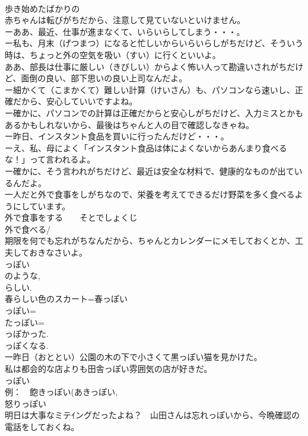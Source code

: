 \documentclass[8pt]{extreport}
\begin{document}
\begin{CJK}{UTF8}{min}
\\	歩き始めたばかりの
\\	赤ちゃんは転びがちだから、注意して見ていないといけません。
\\	ーああ、最近、仕事が進まなくて、いらいらしてしまう・・・。
\\	ー私も、月末（げつまつ）になると忙しいからいらいらしがちだけど、そういう時は、ちょっと外の空気を吸い（すい）に行くといいよ。
\\	ああ、部長は仕事に厳しい（きびしい）からよく怖い人って勘違いされがちだけど、面倒の良い、部下思いの良い上司なんだよ。　
\\	ー細かくて（こまかくて）難しい計算（けいさん）も、パソコンなら速いし、正確だから、安心していいですよね。
\\	ー確かに、パソコンでの計算は正確だからと安心しがちだけど、入力ミスとかもあるかもしれないから、最後はちゃんと人の目で確認しなきゃね。
\\	ー昨日、インスタント食品を買いに行ったんだけど・・・。
\\	ーえ、私、母によく「インスタント食品は体によくないからあんまり食べるな！」って言われるよ。
\\	ー確かに、そう言われがちだけど、最近は安全な材料で、健康的なものが出ているんだよ。
\\	一人だと外で食事をしがちなので、栄養を考えてできるだけ野菜を多く食べるようにしています。
\\	外で食事をする　　そとでしょくじ
\\	外で食べる/
\\	期限を何でも忘れがちなんだから、ちゃんとカレンダーにメモしておくとか、工夫しておきなさいよ。
\\	っぽい
\\	のような, 
\\	らしい. 
\\	春らしい色のスカート=春っぽい
\\	っぽい= 
\\	たっぽい= 
\\	っぽかった.
\\	っぽくなる. 
\\	一昨日（おととい）公園の木の下で小さくて黒っぽい猫を見かけた。
\\	私は都会的な店よりも田舎っぽい雰囲気の店が好きだ。
\\	っぽい
\\	例：　飽きっぽい(あきっぽい, 
\\	怒りっぽい 
\\	明日は大事なミテｲングだったよね？　山田さんは忘れっぽいから、今晩確認の電話をしておくね。

\end{CJK}
\end{document}
